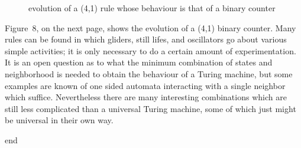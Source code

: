 \begin{figure}[htp]
\centering 
\fbox{\rule{0mm}{85mm}\rule{124mm}{0mm}} 
\caption{evolution of a (4,1) rule whose behaviour is that of a binary 
counter} 
\end{figure} 

Figure~8, on the next page, shows the evolution of a (4,1) binary 
counter. Many rules can be found in which gliders, still lifes, and 
oscillators go about various simple activities; it is only necessary to 
do a certain amount of experimentation. It is an open question as to 
what the minimum combination of states and neighborhood is needed to 
obtain the behaviour of a Turing machine, but some examples are known 
of one sided automata interacting with a single neighbor which suffice. 
Nevertheless there are many interesting combinations which are still 
less complicated than a universal Turing machine, some of which just 
might be universal in their own way. 

end


